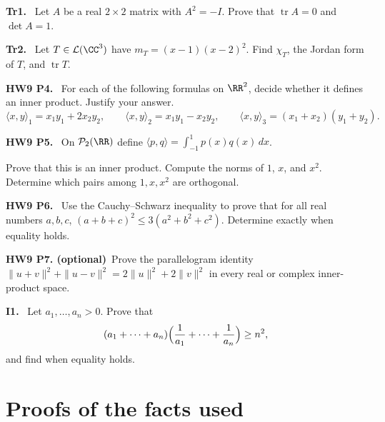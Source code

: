 \documentclass[10pt]{scrartcl}
\newcommand{\ip}[2]{\langle #1,#2\rangle}
\DeclareMathOperator{\tr}{tr}\DeclareMathOperator{\nul}{null}\DeclareMathOperator{\range}{range}\DeclareMathOperator{\spn}{span}
\newcommand{\LL}{\mathcal L}\newcommand{\PP}{\mathcal P}\newcommand{\MM}{\mathcal M}
\begin{document}
\begin{prob}
\textbf{Tr1. }\ Let $A$ be a real $2\times2$ matrix with $A^2=-I$. Prove that $\tr A=0$ and $\det A=1$.
\end{prob}

\begin{prob}
\textbf{Tr2. }\ Let $T\in\LL(\CC^3)$ have $m_T=(x-1)(x-2)^2$. Find $\chi_T$, the Jordan form of $T$, and $\tr T$.
\end{prob}

\begin{prob}
\textbf{HW9 P4. }\ For each of the following formulas on $\RR^2$, decide whether it defines an inner product. Justify your answer.
\[ \ip xy_1=x_1y_1+2x_2y_2,\qquad\ip xy_2=x_1y_1-x_2y_2,\qquad\ip xy_3=(x_1+x_2)(y_1+y_2). \]
\end{prob}

\begin{prob}
\textbf{HW9 P5. }\ On $\PP_2(\RR)$ define $\ip pq=\int_{-1}^1p(x)q(x)\,dx$.
\begin{enumerate}[(a)]
  \ii Prove that this is an inner product.
  \ii Compute the norms of $1$, $x$, and $x^2$.
  \ii Determine which pairs among $1,x,x^2$ are orthogonal.
\end{enumerate}
\end{prob}

\begin{prob}
\textbf{HW9 P6. }\ Use the Cauchy--Schwarz inequality to prove that for all real numbers $a,b,c$, $(a+b+c)^2\le3(a^2+b^2+c^2)$. Determine exactly when equality holds.
\end{prob}

\begin{prob}
\textbf{HW9 P7. (optional)}\ Prove the parallelogram identity $\|u+v\|^2+\|u-v\|^2=2\|u\|^2+2\|v\|^2$ in every real or complex inner-product space.
\end{prob}

\begin{prob}
\textbf{I1. }\ Let $a_1,\dots,a_n>0$. Prove that
\[ (a_1+\dots+a_n)\Bigl(\frac1{a_1}+\dots+\frac1{a_n}\Bigr)\ge n^2, \]
and find when equality holds.
\end{prob}


\section{Proofs of the facts used}
\end{document}
